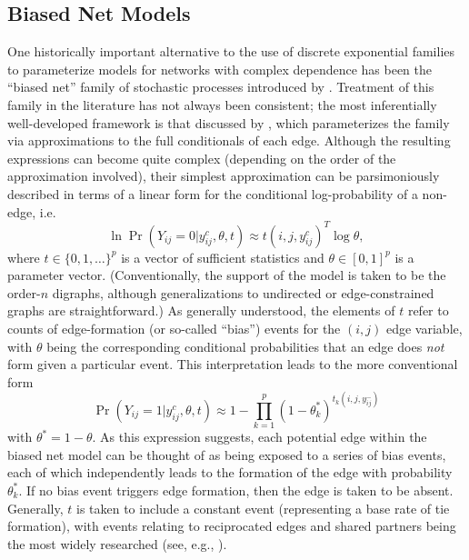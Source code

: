 \documentclass[11pt]{article}
\begin{document}
\subsection{Biased Net Models \label{sec_bn}} 

One historically important alternative to the use of discrete exponential families to parameterize models for networks with complex dependence has been the ``biased net'' family of stochastic processes introduced by \citet{rapoport:bmb:1949a,rapoport:bmb:1949b,rapoport:bmb:1950}.  Treatment of this family in the literature has not always been consistent; the most inferentially well-developed framework is that discussed by \citet{skvoretz.et.al:sn:2004}, which parameterizes the family via approximations to the full conditionals of each edge.  Although the resulting expressions can become quite complex (depending on the order of the approximation involved), their simplest approximation can be parsimoniously described in terms of a linear form for the conditional log-probability of a non-edge, i.e.
\begin{equation}
\ln \Pr\left(Y_{ij}=0|y^c_{ij},\theta,t\right) \approx t\left(i,j,y^c_{ij}\right)^T \log \theta,
\end{equation}
where $t\in \{0,1,\dots\}^p$ is a vector of sufficient statistics and $\theta \in [0,1]^p$ is a parameter vector.  (Conventionally, the support of the model is taken to be the order-$n$ digraphs, although generalizations to undirected or edge-constrained graphs are straightforward.)  As generally understood, the elements of $t$ refer to counts of edge-formation (or so-called ``bias'') events for the $(i,j)$ edge variable, with $\theta$ being the corresponding conditional probabilities that an edge does \emph{not} form given a particular event.  This interpretation leads to the more conventional form
\begin{equation}
\Pr\left(Y_{ij}=1|y^c_{ij},\theta,t\right) \approx 1-\prod_{k=1}^p\left(1-\theta^*_k\right)^{t_k\left(i,j,y^-_{ij}\right)} \label{e_bn}
\end{equation}
with $\theta^*=1-\theta$.  As this expression suggests, each potential edge within the biased net model can be thought of as being exposed to a series of bias events, each of which independently leads to the formation of the edge with probability $\theta^*_k$.  If no bias event triggers edge formation, then the edge is taken to be absent.  Generally, $t$ is taken to include a constant event (representing a base rate of tie formation), with events relating to reciprocated edges and shared partners being the most widely researched (see, e.g., \citet{skvoretz:sn:1985,skvoretz:sn:1990,skvoretz.et.al:sn:2004}).
\end{document}
